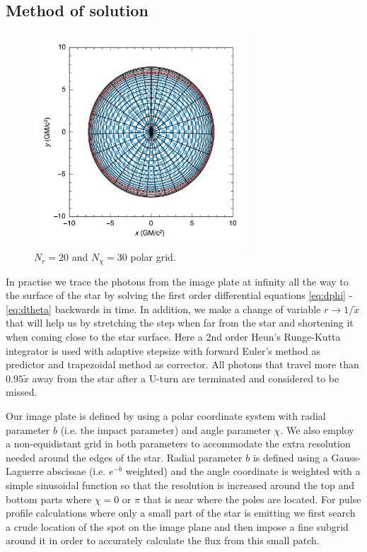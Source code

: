 \documentclass[iop, usenatbib]{emulateapj}
\begin{document}
\subsection{Method of solution}


\begin{figure}
\centering
\includegraphics[width=8cm]{figs/fig6a.pdf}
\caption{\label{fig:grid}
  $N_r = 20$ and $N_{\chi} = 30$ polar grid.
}
\end{figure}


In practise we trace the photons from the image plate at infinity all the way to the surface of the star by solving the first order differential equations \eqref{eq:dphi} - \eqref{eq:dtheta} backwards in time.
In addition, we make a change of variable $r \rightarrow 1/\tilde{x}$ that will help us by stretching the step when far from the star and shortening it when coming close to the star surface.
Here a 2nd order Heun's Runge-Kutta integrator is used with adaptive stepsize with forward Euler's method as predictor and trapezoidal method as corrector.
All photons that travel more than $0.95\tilde{x}$ away from the star after a U-turn are terminated and considered to be missed.

Our image plate is defined by using a polar coordinate system with radial parameter $b$ (i.e. the impact parameter) and angle parameter $\chi$.
We also employ a non-equidistant grid in both parameters to accommodate the extra resolution needed around the edges of the star.
Radial parameter $b$ is defined using a Gauss-Laguerre abscissae (i.e. $e^{-b}$ weighted) and the angle coordinate is weighted with a simple sinusoidal function so that the resolution is increased around the top and bottom parts where $\chi = 0$ or $\pi$ that is near where the poles are located.
For pulse profile calculations where only a small part of the star is emitting we first search a crude location of the spot on the image plane and then impose a fine subgrid around it in order to accurately calculate the flux from this small patch.
\end{document}
